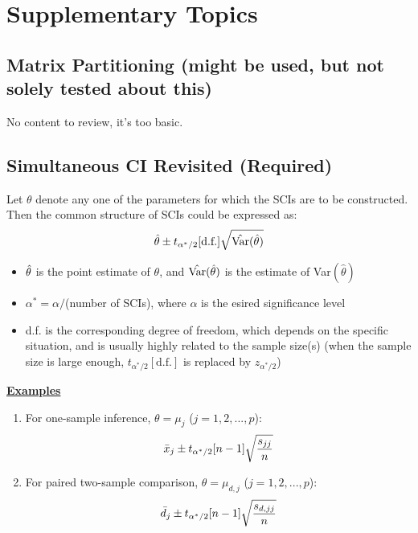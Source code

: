 \documentclass[12pt]{extarticle}
\newcommand{\<}{\langle}
\renewcommand{\>}{\rangle}
\theoremstyle{definition}
\begin{document}
\section{Supplementary Topics}
\subsection{Matrix Partitioning (might be used, but not solely tested about this)}
No content to review, it's too basic.

\newpage
\subsection{Simultaneous CI Revisited (Required)}
\begin{tcolorbox}[enhanced, drop fuzzy shadow, title=Generalization of SCIs]
Let $\theta$ denote any one of the parameters for which the SCIs are to be constructed. Then the common structure of SCIs could be expressed as:
\begin{align*}
    \Hat{\theta} \pm t_{\alpha^* /2}[\text{d.f.}]\sqrt{\Hat{\text{Var}}(\hat{\theta})}
\end{align*}
\begin{itemize}
    \item $\Hat{\theta}$ is the point estimate of $\theta$, and $\Hat{\text{Var}}(\hat{\theta})$ is the estimate of Var$(\hat{\theta})$
    \item $\alpha^* = \alpha/$(number of SCIs), where $\alpha$ is the esired significance level
    \item d.f. is the corresponding degree of freedom, which depends on the specific situation, and is usually highly related to the sample size(s) (when the sample size is large enough, $t_{\alpha^* /2}[\text{d.f.}]$ is replaced by $z_{\alpha^* /2}$)
\end{itemize}
\underline{\textbf{Examples}}\\
\begin{enumerate}
    \item For one-sample inference, $\theta = \mu_j$ ($j=1,2,...,p$):
    \begin{align*}
        \Bar{x}_j \pm t_{\alpha^* /2}[n-1]\sqrt{\frac{s_{jj}}{n}}
    \end{align*}
    \item For paired two-sample comparison, $\theta = \mu_{d,j}$ ($j=1,2,...,p$):
    \begin{align*}
        \Bar{d}_j \pm t_{\alpha^* /2}[n-1]\sqrt{\frac{s_{d,jj}}{n}}
    \end{align*}

\end{enumerate}
\end{tcolorbox}
\end{document}
